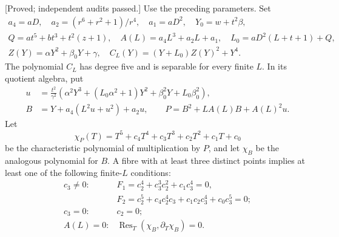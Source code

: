 \begin{lemma}
\label{lem:uniform-eleven-quintic-fibres-candidate}
\textup{[Proved; independent audits passed.]}
Use the preceding parameters. Set
\[
\begin{gathered}
 a_4=aD,\quad a_2=(r^6+r^2+1)/r^4,\quad a_1=aD^2,\quad
 Y_0=w+t^2\beta,\\
 Q=at^5+bt^3+t^2(z+1),\quad
 A(L)=a_4L^3+a_2L+a_1,\quad
 L_0=aD^2(L+t+1)+Q,\\
 Z(Y)=\alpha Y^2+\beta_0Y+\gamma,\quad
 C_L(Y)=(Y+L_0)Z(Y)^2+Y^4.
\end{gathered}                                                  \tag{E11.6}
\]
The polynomial $C_L$ has degree five and is separable for every finite
$L$. In its quotient algebra, put
\[
\begin{split}
 u&=\frac{t^2}{\gamma^2}
   \left(\alpha^2Y^3+(L_0\alpha^2+1)Y^2
                    +\beta_0^2Y+L_0\beta_0^2\right),\\
 B&=Y+a_4(L^2u+u^2)+a_2u,\qquad
 P=B^2+LA(L)B+A(L)^2u.
\end{split}                                                     \tag{E11.7}
\]
Let
\[
 \chi_P(T)=T^5+c_4T^4+c_3T^3+c_2T^2+c_1T+c_0
\]
be the characteristic polynomial of multiplication by $P$, and let
$\chi_B$ be the analogous polynomial for $B$. A fibre with at least
three distinct points implies at least one of the following finite-$L$
conditions:
\[
\begin{array}{ll}
 c_3\ne0:&
 F_1=c_2^4+c_3^3c_2^2+c_1c_3^4=0,\\
 &F_2=c_2^5+c_4c_2^4c_3+c_1c_2c_3^4+c_0c_3^5=0;\\[2pt]
 c_3=0:&c_2=0;\\[2pt]
 A(L)=0:&\operatorname{Res}_T(\chi_B,\partial_T\chi_B)=0.
\end{array}                                                     \tag{E11.8}
\]
\end{lemma}
